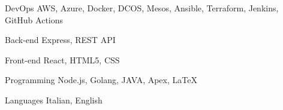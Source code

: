 

\begin{cvskills}

  \cvskill
    {DevOps} %
    {AWS, Azure, Docker, DCOS, Mesos, Ansible, Terraform, Jenkins, GitHub Actions} %

  \cvskill
    {Back-end} %
    {Express, REST API} %

  \cvskill
    {Front-end} %
    {React, HTML5, CSS} %

  \cvskill
    {Programming} %
    {Node.js, Golang, JAVA, Apex, LaTeX} %

  \cvskill
    {Languages} %
    {Italian, English} %

\end{cvskills}

